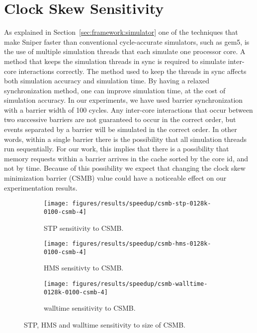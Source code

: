 \section{Clock Skew Sensitivity}
\label{sec:results:csmb_sensitivity}

As explained in Section~\ref{sec:framework:simulator} one of the techniques that make Sniper faster than conventional cycle-accurate simulators, such as gem5, is the use of multiple simulation threads that each simulate one processor core.
A method that keeps the simulation threads in sync is required to simulate inter-core interactions correctly.
The method used to keep the threads in sync affects both simulation accuracy and simulation time.
By having a relaxed synchronization method, one can improve simulation time, at the cost of simulation accuracy.
In our experiments, we have used barrier synchronization with a barrier width of 100 cycles.
Any inter-core interactions that occur between two successive barriers are not guaranteed to occur in the correct order, but events separated by a barrier will be simulated in the correct order.
In other words, within a single barrier there is the possibility that all simulation threads run sequentially.
For our work, this implies that there is a possibility that memory requests within a barrier arrives in the cache sorted by the core id, and not by time.
Because of this possibility we expect that changing the clock skew minimization barrier (CSMB) value could have a noticeable effect on our experimentation results.

\begin{figure}[th]
    \centering
    \begin{subfigure}[b]{0.5\textwidth}
        \texttt{[image: figures/results/speedup/csmb-stp-0128k-0100-csmb-4]}
        \caption{STP sensitivity to CSMB.}
        \label{fig:results:csmb:stp}
    \end{subfigure}%
    \begin{subfigure}[b]{0.5\textwidth}
        \texttt{[image: figures/results/speedup/csmb-hms-0128k-0100-csmb-4]}
        \caption{HMS sensitivty to CSMB.}
        \label{fig:results:csmb:hms}
    \end{subfigure}
    \begin{subfigure}[b]{0.6\textwidth}
        \texttt{[image: figures/results/speedup/csmb-walltime-0128k-0100-csmb-4]}
        \caption{walltime sensitivity to CSMB.}
        \label{fig:results:csmb:walltime}
    \end{subfigure}
    \caption{STP, HMS and walltime sensitivity to size of CSMB.}
    \label{fig:results:csmb}
\end{figure}


